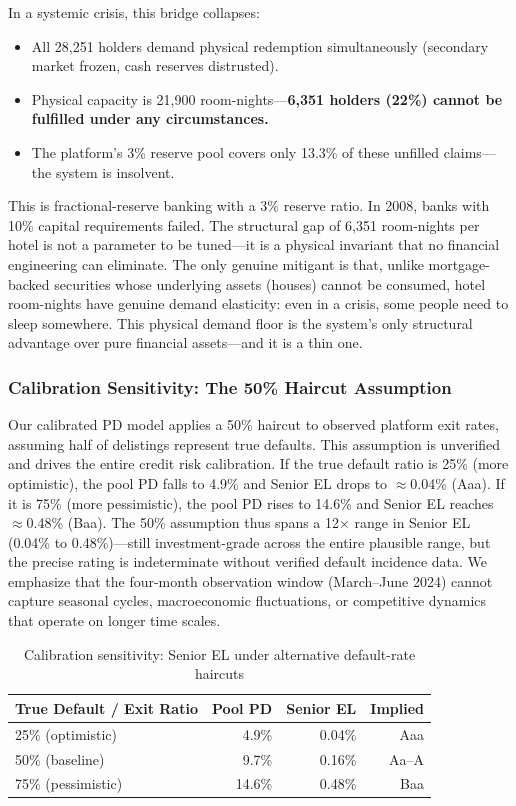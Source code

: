 \documentclass[12pt,a4paper]{article}
\begin{document}
In a systemic crisis, this bridge collapses:
\begin{itemize}[nosep]
    \item All 28,251 holders demand physical redemption simultaneously (secondary market frozen, cash reserves distrusted).
    \item Physical capacity is 21,900 room-nights---\textbf{6,351 holders (22\%) cannot be fulfilled under any circumstances.}
    \item The platform's 3\% reserve pool covers only 13.3\% of these unfilled claims---the system is insolvent.
\end{itemize}

This is fractional-reserve banking with a 3\% reserve ratio.
In 2008, banks with 10\% capital requirements failed.
The structural gap of 6,351 room-nights per hotel is not a parameter to be tuned---it is a physical invariant that no financial engineering can eliminate.
The only genuine mitigant is that, unlike mortgage-backed securities whose underlying assets (houses) cannot be consumed, hotel room-nights have genuine demand elasticity: even in a crisis, some people need to sleep somewhere.
This physical demand floor is the system's only structural advantage over pure financial assets---and it is a thin one.

\subsubsection{Calibration Sensitivity: The 50\% Haircut Assumption}

Our calibrated PD model applies a 50\% haircut to observed platform exit rates, assuming half of delistings represent true defaults.
This assumption is unverified and drives the entire credit risk calibration.
If the true default ratio is 25\% (more optimistic), the pool PD falls to 4.9\% and Senior EL drops to $\approx$0.04\% (Aaa).
If it is 75\% (more pessimistic), the pool PD rises to 14.6\% and Senior EL reaches $\approx$0.48\% (Baa).
The 50\% assumption thus spans a 12$\times$ range in Senior EL (0.04\% to 0.48\%)---still investment-grade across the entire plausible range, but the precise rating is indeterminate without verified default incidence data.
We emphasize that the four-month observation window (March--June 2024) cannot capture seasonal cycles, macroeconomic fluctuations, or competitive dynamics that operate on longer time scales.
\begin{table}[H]
\centering
\caption{Calibration sensitivity: Senior EL under alternative default-rate haircuts}
\label{tab:haircut}
\begin{tabular}{@{}lrrr@{}}
\toprule
\textbf{True Default / Exit Ratio} & \textbf{Pool PD} & \textbf{Senior EL} & \textbf{Implied} \\
\midrule
25\% (optimistic) & 4.9\% & 0.04\% & Aaa \\
50\% (baseline)   & 9.7\% & 0.16\% & Aa--A \\
75\% (pessimistic) & 14.6\% & 0.48\% & Baa \\
\bottomrule
\end{tabular}
\end{table}
\end{document}
